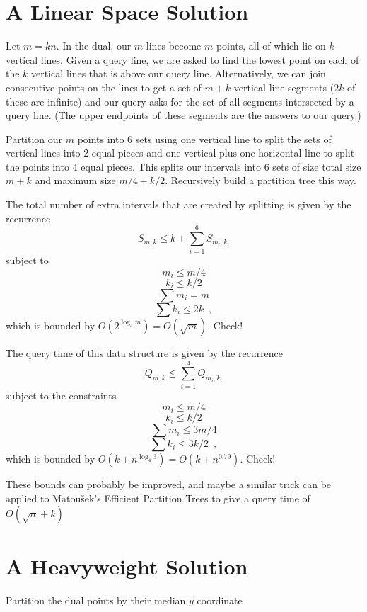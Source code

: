 \documentclass{article}
\begin{document}
\section{A Linear Space Solution}

Let $m=kn$. In the dual, our $m$ lines become $m$ points, all of which
lie on $k$ vertical lines.  Given a query line, we are asked to find
the lowest point on each of the $k$ vertical lines that is above our
query line.  Alternatively, we can join consecutive points on the
lines to get a set of $m+k$ vertical line segments ($2k$ of these are
infinite) and our query asks for the set of all segments intersected
by a query line.  (The upper endpoints of these segments are the
answers to our query.)

Partition our $m$ points into 6 sets using one vertical line to split
the sets of vertical lines into 2 equal pieces and one vertical plus
one horizontal line to split the points into $4$ equal pieces.  This
splits our intervals into 6 sets of size total size $m+k$ and maximum
size $m/4+k/2$.  Recursively build a partition tree this way.  

The total number of extra intervals that are created by splitting is
given by the recurrence
\[
   S_{m,k} \le k + \sum_{i=1}^6 S_{m_i,k_i}
\]
subject to
\[ m_i\le m/4 \]
\[ k_i\le k/2 \]
\[ \sum m_i=m \]
\[ \sum k_i \le 2k \enspace , \] 
which is bounded by $O(2^{\log_4 m})=O(\sqrt{m})$.  Check!

The query time of this data structure is given by the recurrence
\[
  Q_{m,k} \le \sum_{i=1}^4 Q_{m_i,k_i}
\]
subject to the constraints
\[ m_i\le m/4 \]
\[ k_i\le k/2 \]
\[ \sum m_i\le 3m/4 \]
\[ \sum k_i\le 3k/2 \enspace , \] 
which is bounded by $O(k+n^{\log_4 3})=O(k+n^{0.79})$.  Check!

These bounds can probably be improved, and maybe a similar trick can
be applied to Matou\v{s}ek's Efficient Partition Trees to give a query
time of $O(\sqrt{n}+k)$

\section{A Heavyweight Solution}

Partition the dual points by their median $y$ coordinate





\end{document}

